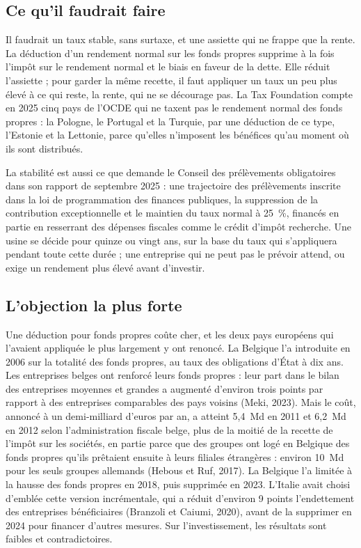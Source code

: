 \documentclass[11pt,a4paper]{article}
\providecommand{\euro}{\texteuro}
\begin{document}
\subsection{Ce qu'il faudrait faire}

Il faudrait un taux stable, sans surtaxe, et une assiette qui ne frappe que la rente. La déduction
d'un rendement normal sur les fonds propres supprime à la fois l'impôt sur le rendement normal et le
biais en faveur de la dette. Elle réduit l'assiette ; pour garder la même recette, il faut appliquer
un taux un peu plus élevé à ce qui reste, la rente, qui ne se décourage pas. La Tax Foundation compte
en 2025 cinq pays de l'OCDE qui ne taxent pas le rendement normal des fonds propres : la Pologne, le
Portugal et la Turquie, par une déduction de ce type, l'Estonie et la Lettonie, parce qu'elles
n'imposent les bénéfices qu'au moment où ils sont distribués.

La stabilité est aussi ce que demande le Conseil des prélèvements obligatoires dans son rapport de
septembre 2025 : une trajectoire des prélèvements inscrite dans la loi de programmation des finances
publiques, la suppression de la contribution exceptionnelle et le maintien du taux normal à 25~\%,
financés en partie en resserrant des dépenses fiscales comme le crédit d'impôt recherche. Une usine
se décide pour quinze ou vingt ans, sur la base du taux qui s'appliquera pendant toute cette durée ;
une entreprise qui ne peut pas le prévoir attend, ou exige un rendement plus élevé avant d'investir.

\subsection{L'objection la plus forte}

Une déduction pour fonds propres coûte cher, et les deux pays européens qui l'avaient appliquée le
plus largement y ont renoncé. La Belgique l'a introduite en 2006 sur la totalité des fonds propres,
au taux des obligations d'État à dix ans. Les entreprises belges ont renforcé leurs fonds propres :
leur part dans le bilan des entreprises moyennes et grandes a augmenté d'environ trois points par
rapport à des entreprises comparables des pays voisins (Meki, 2023). Mais le coût, annoncé à un
demi-milliard d'euros par an, a atteint 5,4~Md\euro{} en 2011 et 6,2~Md\euro{} en 2012 selon
l'administration fiscale belge, plus de la moitié de la recette de l'impôt sur les sociétés, en
partie parce que des groupes ont logé en Belgique des fonds propres qu'ils prêtaient ensuite à leurs
filiales étrangères : environ 10~Md\euro{} pour les seuls groupes allemands (Hebous et Ruf, 2017).
La Belgique l'a limitée à la hausse des fonds propres en 2018, puis supprimée en 2023. L'Italie avait
choisi d'emblée cette version incrémentale, qui a réduit d'environ 9 points l'endettement des
entreprises bénéficiaires (Branzoli et Caiumi, 2020), avant de la supprimer en 2024 pour financer
d'autres mesures. Sur l'investissement, les résultats sont faibles et contradictoires.
\end{document}

